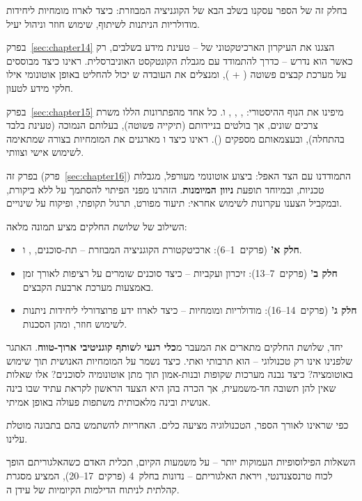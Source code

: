 בחלק זה של הספר עסקנו בשלב הבא של הקוגניציה המבוזרת: כיצד לארוז מומחיות ליחידות מודולריות הניתנות לשיתוף, שימוש חוזר וניהול יעיל.

בפרק~\ref{sec:chapter14} הצגנו את העיקרון הארכיטקטוני של  – טעינת מידע בשלבים, רק כאשר הוא נדרש – כדרך להתמודד עם מגבלת הקונטקסט האוניברסלית. ראינו כיצד  מבוססים על מערכת קבצים פשוטה ( + ), ומנצלים את העובדה ש יכול להחליט באופן אוטונומי אילו חלקי מידע לטעון.

בפרק~\ref{sec:chapter15} מיפינו את הנוף ההיסטורי: , , , ו. כל אחד מהפתרונות הללו משרת צרכים שונים, אך  בולטים בניידותם (תיקייה פשוטה), בעלותם הנמוכה (טעינת  בלבד בהתחלה), ובעצמאותם מספקים (). ראינו כיצד  ו מארגנים את המומחיות בצורה שמתאימה לשימוש אישי וצוותי.

בפרק זה (פרק~\ref{sec:chapter16}) התמודדנו עם הצד האפל: ביצוע אוטונומי מעורפל, מגבלות טכניות, ובמיוחד תופעת \textbf{ניוון המיומנות}. הזהרנו מפני הפיתוי להסתמך על  ללא ביקורת, ובמקביל הצענו עקרונות לשימוש אחראי: תיעוד מפורט, תרגול תקופתי, ופיקוח על שינויים.

השילוב של שלושת החלקים מציע תמונה מלאה:

\begin{itemize}
  \item \textbf{חלק א'} (פרקים~\num{1}–\num{6}): ארכיטקטורת הקוגניציה המבוזרת – תת-סוכנים, , ו.
  \item \textbf{חלק ב'} (פרקים~\num{7}–\num{13}): זיכרון ועקביות – כיצד סוכנים שומרים על רציפות לאורך זמן באמצעות מערכת ארבעת הקבצים.
  \item \textbf{חלק ג'} (פרקים~\num{14}–\num{16}): מודולריות ומומחיות – כיצד לארוז ידע פרוצדורלי ליחידות ניתנות לשימוש חוזר, ומהן הסכנות.
\end{itemize}

יחד, שלושת החלקים מתארים את המעבר מ\textbf{כלי רגעי} ל\textbf{שותף קוגניטיבי ארוך-טווח}. האתגר שלפנינו אינו רק טכנולוגי – הוא תרבותי ואתי. כיצד נשמר על המומחיות האנושית תוך שימוש באוטומציה? כיצד נבנה מערכות שקופות ובנות-אמון תוך מתן אוטונומיה לסוכנים? אלו שאלות שאין להן תשובה חד-משמעית, אך הכרה בהן היא הצעד הראשון לקראת עתיד שבו בינה אנושית ובינה מלאכותית משתפות פעולה באופן אמיתי.

כפי שראינו לאורך הספר, הטכנולוגיה מציעה כלים. האחריות להשתמש בהם בתבונה מוטלת עלינו.

השאלות הפילוסופיות העמוקות יותר – על משמעות הקיום, תכלית האדם כשהאלגוריתם הופך לכוח טרנסצנדנטי, ויראת האלגוריתם – נדונות בחלק~\num{4} (פרקים~\num{17}--\num{20}), המציע מסגרת קהלתית לניתוח הדילמות הקיומיות של עידן ה.

